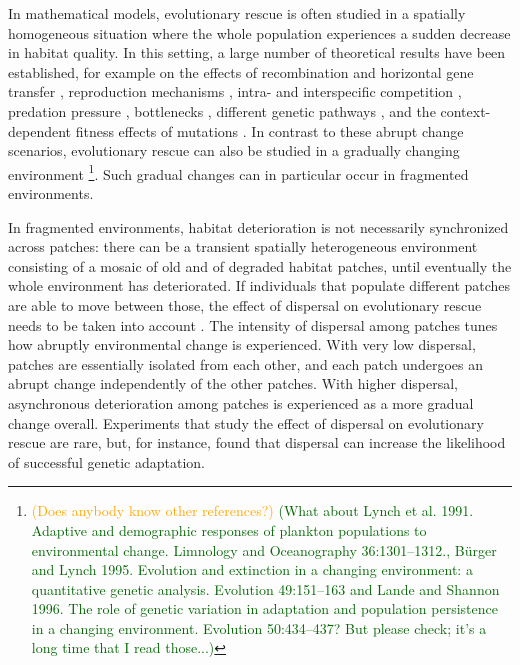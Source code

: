 \documentclass[a4paper,11pt]{article}
\newcommand{\hildegard}[1]{\textcolor{darkgreen}{(#1)}}
\newcommand{\pete}[1]{\textcolor{orange}{(#1)}}
\newcommand{\chg}[1]{\textcolor{change}{#1}}
\begin{document}
In mathematical models, evolutionary rescue is often studied in a spatially homogeneous situation where the whole population experiences a sudden decrease in habitat quality. In this setting, a large number of theoretical results have been established, for example on the effects of recombination \citep{uecker_2015} and horizontal gene transfer \citep{tazzyman_2014}, reproduction mechanisms \citep{glemin_2013,uecker_2017}, intra- and interspecific competition \citep{osmond_2013}, predation pressure \chg{\citep{yamamichi_2015}}, bottlenecks \citep{martin_2013}, different genetic pathways \citep{osmond_2019}, and the context-dependent fitness effects of mutations \citep{anciaux_2018}. \chg{In contrast to these abrupt change scenarios, evolutionary rescue can also be studied in a gradually changing environment \citep[e.g.][]{osmond_2017}}\footnote{\pete{Does anybody know other references?} \hildegard{What about Lynch et al. 1991. Adaptive and  demographic responses of plankton populations to environmental change. Limnology and Oceanography 36:1301--1312., B{\"u}rger and Lynch 1995. Evolution and extinction in a changing environment: a quantitative genetic analysis. Evolution 49:151--163 and Lande and Shannon 1996. The role of  genetic  variation  in adaptation and population persistence in a changing environment. Evolution 50:434--437? But please check; it's a long time that I read those...}}. 
Such gradual changes can in particular occur in fragmented environments.

In fragmented environments, habitat deterioration is not necessarily synchronized across patches: there can be a transient spatially heterogeneous environment consisting of a mosaic of old and of degraded habitat patches, until eventually the whole environment has deteriorated. If individuals that populate different patches are able to move between those, the effect of dispersal on evolutionary rescue needs to be taken into account \citep{uecker_2014, tomasini_2019}. \chg{The intensity of dispersal among patches tunes how abruptly environmental change is experienced. With very low dispersal, patches are essentially isolated from each other, and each patch undergoes an abrupt change independently of the other patches. With higher dispersal, asynchronous deterioration among patches is experienced as a more gradual change overall.}
Experiments that study the effect of dispersal on evolutionary rescue are rare, but, for instance, \citet{bell_2011} found that  dispersal can increase the likelihood of successful genetic adaptation. 
\end{document}

